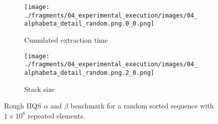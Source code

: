 \begin{figure}
    \centering
    \begin{subfigure}[b]{0.45\textwidth}
        \centering
        \texttt{[image: ./fragments/04\_experimental\_execution/images/04\_alphabeta\_detail\_random.png.0\_0.png]}
        \caption{Cumulated extraction time}
        \label{FIG:05_ALPHABETA_BENCHMARK_RANDOM__0_0}
    \end{subfigure}
    \begin{subfigure}[b]{0.45\textwidth}
        \centering
        \texttt{[image: ./fragments/04\_experimental\_execution/images/04\_alphabeta\_detail\_random.png.2\_0.png]}
        \caption{Stack size}
        \label{FIG:05_ALPHABETA_BENCHMARK_RANDOM__0_1}
    \end{subfigure}



    
    \caption{Rough IIQS $\alpha$ and $\beta$ benchmark for a random sorted sequence with $1\times10^6$ repeated elements.}
    \label{FIG:05_ALPHABETA_BENCHMARK_RANDOM}
\end{figure}




